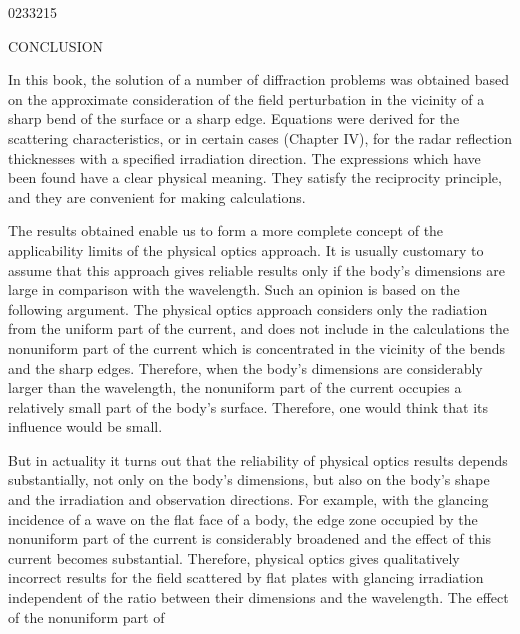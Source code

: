 \begin{scanpage}{0233}{215}
\begin{center}CONCLUSION\end{center}
In this book, the solution of a number of diffraction problems was obtained based on the approximate consideration of the field perturbation in the vicinity of a sharp bend of the surface or a sharp edge. Equations were derived for the scattering characteristics, or in certain cases (Chapter IV), for the radar reflection thicknesses with a specified irradiation direction. The expressions which have been found have a clear physical meaning. They satisfy the reciprocity principle, and they are convenient for making calculations.

The results obtained enable us to form a more complete concept of the applicability limits of the physical optics approach. It is usually customary to assume that this approach gives reliable results only if the body's dimensions are large in comparison with the wavelength. Such an opinion is based on the following argument. The physical optics approach considers only the radiation from the uniform part of the current, and does not include in the calculations the nonuniform part of the current which is concentrated in the vicinity of the bends and the sharp edges. Therefore, when the body's dimensions are considerably larger than the wavelength, the nonuniform part of the current occupies a relatively small part of the body's surface. Therefore, one would think that its influence would be small.

But in actuality it turns out that the reliability of physical optics results depends substantially, not only on the body's dimensions, but also on the body's shape and the irradiation and observation directions. For example, with the glancing incidence of a wave on the flat face of a body, the edge zone occupied by the nonuniform part of the current is considerably broadened and the effect of this current becomes substantial. Therefore, physical optics gives qualitatively incorrect results for the field scattered by flat plates with glancing irradiation independent of the ratio between their dimensions and the wavelength. The effect of the nonuniform part of
\end{scanpage}
